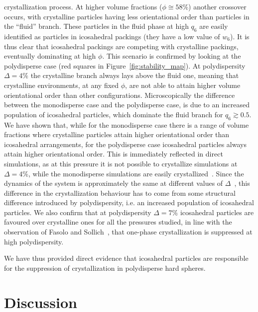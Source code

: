 \documentclass[twocolumn,superscriptaddress]{revtex4}
\begin{document}
crystallization process.
At higher volume fractions ($\phi\cong 58\%$) another crossover occurs, with
crystalline particles having less orientational order than particles in the ``fluid'' branch.
These particles in the fluid phase at high $q_6$ are easily identified as particles in icosahedral packings (they have
a low value of $w_6$).
It is thus clear that icosahedral packings are competing with crystalline packings, eventually dominating
at high $\phi$. This scenario is confirmed by looking at the polydisperse case (red squares in
Figure~\ref{fig:stability_map}).
At polydispersity $\Delta=4\%$ the crystalline branch always lays above the fluid one, meaning that
crystalline environments, at any fixed $\phi$, are not able to attain higher volume orientational order than other configurations.
Microscopically the difference between the monodisperse case and the polydisperse case, is due to an increased population of icosahedral particles, which dominate the fluid branch for $q_6\gtrsim 0.5$.
We have shown that, while for the monodisperse case there is a range of volume fractions where crystalline particles
attain higher orientational order than icosahedral arrangements, for the polydisperse case icosahedral
particles always attain higher orientational order.
This is immediately reflected in direct simulations,
as at this pressure it is not possible to crystallize simulations at $\Delta=4\%$, while the
monodisperse simulations are easily crystallized~\cite{zaccarelli,pusey2009hard}. Since the dynamics of the
system is approximately the same at different values of $\Delta$~\cite{zaccarelli}, this difference in the crystallization behaviour has to come from
some structural difference introduced by polydispersity, i.e. an increased population of icosahedral particles.
We also confirm that at polydispersity $\Delta=7\%$ icosahedral particles are favoured over crystalline ones for
all the pressures studied, in line with the observation of Fasolo and Sollich~\cite{fasolo2004fractionation}, that
one-phase crystallization is suppressed at high polydispersity.

We have thus provided direct evidence that icosahedral particles are responsible for the suppression
of crystallization in polydisperse hard spheres.

\section{Discussion}\label{sec:discussion}
\end{document}
